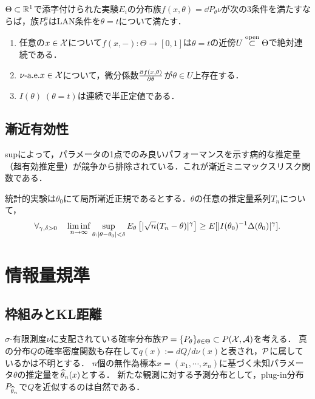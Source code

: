 \documentclass[uplatex,dvipdfmx]{jsreport}
\begin{document}
\begin{theorem}[Hajekの十分条件]
    $\Theta\subset\R^1$で添字付けられた実験$E_i$の分布族$f(x,\theta)=\dd{P_\theta}{\nu}$が次の3条件を満たすならば，族$P^n_\theta$はLAN条件を$\theta=t$について満たす．
    \begin{enumerate}
        \item 任意の$x\in\X$について$f(x,-):\Theta\to[0,1]$は$\theta=t$の近傍$U\osub\Theta$で絶対連続である．
        \item $\nu\dae x\in\X$について，微分係数$\pp{f(x,\theta)}{\theta}$が$\theta\in U$上存在する．
        \item $I(\theta)\;(\theta=t)$は連続で半正定値である．
    \end{enumerate}
\end{theorem}

\subsection{漸近有効性}

\begin{tcolorbox}[colframe=ForestGreen, colback=ForestGreen!10!white,breakable,colbacktitle=ForestGreen!40!white,coltitle=black,fonttitle=\bfseries\sffamily,
title=]
    supによって，パラメータの1点でのみ良いパフォーマンスを示す病的な推定量（超有効推定量）が競争から排除されている．これが漸近ミニマックスリスク関数である．
\end{tcolorbox}

\begin{theorem}[Hajekの不等式]
    統計的実験は$\theta_0$にて局所漸近正規であるとする．$\theta$の任意の推定量系列$T_n$について，
    \[\forall_{\gamma,\delta>0}\quad\liminf_{n\to\infty}\sup_{\theta:\abs{\theta-\theta_0}<\delta}E_\theta\Square{\abs{\sqrt{n}(T_n-\theta)}^\gamma}\ge E[\abs{I(\theta_0)^{-1}\Delta(\theta_0)}^\gamma].\]
\end{theorem}

\section{情報量規準}

\subsection{枠組みとKL距離}

\begin{notation}
    $\sigma$-有限測度$\nu$に支配されている確率分布族$\P=\{P_\theta\}_{\theta\in\Theta}\subset P(\X,\A)$を考える．
    真の分布$Q$の確率密度関数も存在して$q(x):=dQ/d\nu(x)$と表され，$\P$に属しているかは不明とする．
    $n$個の無作為標本$x=(x_1,\cdots,x_n)$に基づく未知パラメータ$\theta$の推定量を$\wh{\theta}_n(x)$とする．
    新たな観測に対する予測分布として，plug-in分布$P_{\wh{\theta}_n}$で$Q$を近似するのは自然である．
\end{notation}
\end{document}
